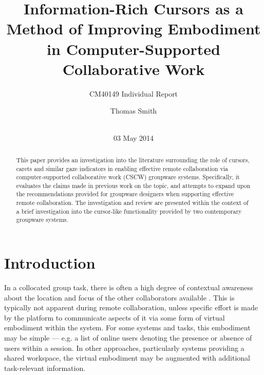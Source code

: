 \documentclass{acm_proc_article-sp}
\begin{document}
\title{Information-Rich Cursors as a Method of Improving Embodiment in Computer-Supported Collaborative Work}
\subtitle{CM40149 Individual Report}

\author{
	\alignauthor Thomas Smith\\
       \\
}
\date{03 May 2014}


\maketitle
\begin{abstract} %
This paper provides an investigation into the literature surrounding the role of cursors, carets and similar gaze indicators in enabling effective remote collaboration via computer-supported collaborative work (CSCW) groupware systems. Specifically, it evaluates the claims made in previous work on the topic, and attempts to expand upon the recommendations provided for groupware designers when supporting effective remote collaboration.
The investigation and review are presented within the context of a brief investigation into the cursor-like functionality provided by two contemporary groupware systems.
\end{abstract}



\section{Introduction}

In a collocated group task, there is often a high degree of contextual awareness about the location and focus of the other collaborators available \cite{olsondistance2000}. This is typically not apparent during remote collaboration, unless specific effort is made by the platform to communicate aspects of it via some form of virtual embodiment within the system. For some systems and tasks, this embodiment may be simple --- e.g. a list of online users denoting the presence or absence of users within a session. In other approaches, particularly systems providing a shared workspace, the virtual embodiment may be augmented with additional task-relevant information.
\end{document}
